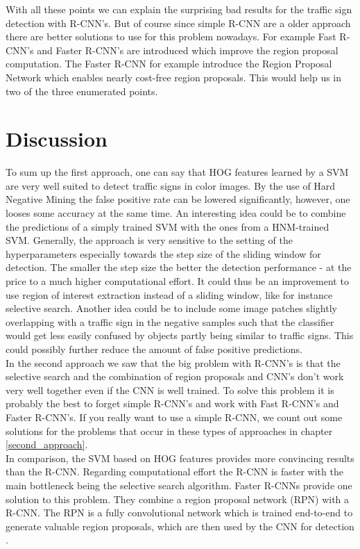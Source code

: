 \documentclass[12pt,a4paper,bibliography=totocnumbered,listof=totocnumbered]{scrartcl}
\begin{document}
With all these points we can explain the surprising bad results for the traffic sign detection with R-CNN's. But of course since simple R-CNN are a older approach there are better solutions to use for this problem nowadays. For example Fast R-CNN's and Faster R-CNN's are introduced which improve the region proposal computation. The Faster R-CNN for example introduce the Region Proposal Network which enables nearly cost-free region proposals. This would help us in two of the three enumerated points.

\pagebreak
\section{Discussion}
To sum up the first approach, one can say that HOG features learned by a SVM are very well suited to detect traffic signs in color images. By the use of Hard Negative Mining the false positive rate can be lowered significantly, however, one looses some accuracy at the same time. An interesting idea could be to combine the predictions of a simply trained SVM with the ones from a HNM-trained SVM. Generally, the approach is very sensitive to the setting of the hyperparameters especially towards the step size of the sliding window for detection. The smaller the step size the better the detection performance - at the price to a much higher computational effort. It could thus be an improvement to use region of interest extraction instead of a sliding window, like for instance selective search. Another idea could be to include some image patches slightly overlapping with a traffic sign in the negative samples such that the classifier would get less easily confused by objects partly being similar to traffic signs. This could possibly further reduce the amount of false positive predictions. \\

In the second approach we saw that the big problem with R-CNN's is that the selective search and the combination of region proposals and CNN's don't work very well together even if the CNN is well trained. To solve this problem it is probably the best to forget simple R-CNN's and work with Fast R-CNN's and Faster R-CNN's. If you really want to use a simple R-CNN, we count out some solutions for the problems that occur in these types of approaches in chapter \ref{second_approach}.\\

In comparison, the SVM based on HOG features provides more convincing results than the R-CNN. Regarding computational effort the R-CNN is faster with the main bottleneck being the selective search algorithm. Faster R-CNNs provide one solution to this problem. They combine a region proposal network (RPN) with a R-CNN. The RPN is a fully convolutional network which is trained end-to-end to generate valuable region proposals, which are then used by the CNN for detection \cite{DBLP:journals/corr/RenHG015}. 
\end{document}
